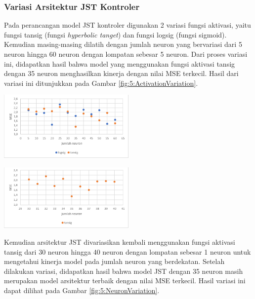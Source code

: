 \documentclass[a4paper,10pt]{article}
\makeatletter
\newenvironment{body}{\begin{multicols}{2}}{\end{multicols}}
\renewenvironment{figure}
{\def\@captype{figure}%
	\captionsetup{labelsep=period,format=hang,font=footnotesize,justification=justified}
}
{}
\makeatother
\begin{document}
\begin{body}
		\subsubsection{Variasi Arsitektur JST Kontroler}
		
		Pada perancangan model JST kontroler digunakan 2 variasi fungsi aktivasi, yaitu fungsi tansig (fungsi \textit{hyperbolic tanget}) dan fungsi logsig (fungsi sigmoid). Kemudian masing-masing dilatih dengan jumlah neuron yang bervariasi dari 5 neuron hingga 60 neuron dengan lompatan sebesar 5 neuron. Dari proses variasi ini, didapatkan hasil bahwa model yang menggunakan fungsi aktivasi tansig dengan 35 neuron menghasilkan kinerja dengan nilai MSE terkecil. Hasil dari variasi ini ditunjukkan pada Gambar \ref{fig:5:ActivationVariation}.
		
		\begin{figure}
			\centering
			\includegraphics[width=0.5\textwidth]{figures/ActivationVariation}
			\caption{Grafik Persebaran MSE Variasi Arsitektur JST Kontroler}
			\label{fig:5:ActivationVariation}
		\end{figure}
		
		\begin{figure}
			\centering
			\includegraphics[width=0.5\textwidth]{figures/NeuronVariation}
			\caption{Grafik Persebaran MSE Variasi Arsitektur JST Kontroler}
			\label{fig:5:NeuronVariation}
		\end{figure}
		\vspace{1em}
		
		Kemudian arsitektur JST divariasikan kembali menggunakan fungsi aktivasi tansig dari 30 neuron hingga 40 neuron dengan lompatan sebesar 1 neuron untuk mengetahui kinerja model pada jumlah neuron yang berdekatan. Setelah dilakukan variasi, didapatkan hasil bahwa model JST dengan 35 neuron masih merupakan model arsitektur terbaik dengan nilai MSE terkecil. Hasil variasi ini dapat dilihat pada Gambar \ref{fig:5:NeuronVariation}.\\
		

\end{body}
\end{document}

